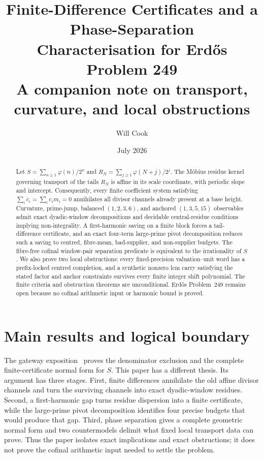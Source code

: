 \documentclass[11pt]{article}
\title{Finite-Difference Certificates and a Phase-Separation\\
Characterisation for Erd\H{o}s Problem 249\\
{\large A companion note on transport, curvature, and local obstructions}}
\author{Will Cook}
\date{July 2026}
\theoremstyle{remark}\newtheorem*{remark}{Remark}
\newcommand{\ph}{\varphi}
\begin{document}
\sloppy
\maketitle
\begin{abstract}
Let $S=\sum_{n\geq1}\ph(n)/2^n$ and
$R_N=\sum_{j\geq1}\ph(N+j)/2^j$.  The M\"obius residue kernel governing
transport of the tails $R_N$ is affine in its scale coordinate, with periodic
slope and intercept.  Consequently, every finite coefficient system satisfying
$\sum_i c_i=\sum_i c_im_i=0$ annihilates all divisor channels already present
at a base height.  Curvature, prime-jump, balanced $(1,2,3,6)$, and anchored
$(1,3,5,15)$ observables admit exact dyadic-window decompositions and
decidable central-residue conditions implying non-integrality.  A
first-harmonic saving on a finite block forces a tail-difference certificate,
and an exact four-term large-prime pivot decomposition reduces such a saving
to centred, fibre-mean, bad-supplier, and non-supplier budgets.  The fibre-free
cofinal window-pair separation predicate is equivalent to the irrationality
of $S$.  We also prove two local obstructions: every fixed-precision
valuation--unit word has a prefix-locked centred completion, and a synthetic
nonzero lcm carry satisfying the stated factor and anchor constraints survives
every finite integer shift polynomial.  The finite criteria and obstruction
theorems are unconditional.  Erd\H{o}s Problem~249 remains open because no
cofinal arithmetic input or harmonic bound is proved.
\end{abstract}

\section{Main results and logical boundary}\label{sec:scope}

The gateway exposition~\cite{mainpaper} proves the denominator exclusion and
the complete finite-certificate normal form for $S$.  This paper has a
different thesis.  Its argument has three stages.  First, finite differences
annihilate the old affine divisor channels and turn the surviving channels
into exact dyadic-window residues.  Second, a first-harmonic gap turns residue
dispersion into a finite certificate, while the large-prime pivot
decomposition identifies four precise budgets that would produce that gap.
Third, phase separation gives a complete geometric normal form and two
countermodels delimit what fixed local transport data can prove.  Thus the
paper isolates exact implications and exact obstructions; it does not prove
the cofinal arithmetic input needed to settle the problem.
\end{document}
